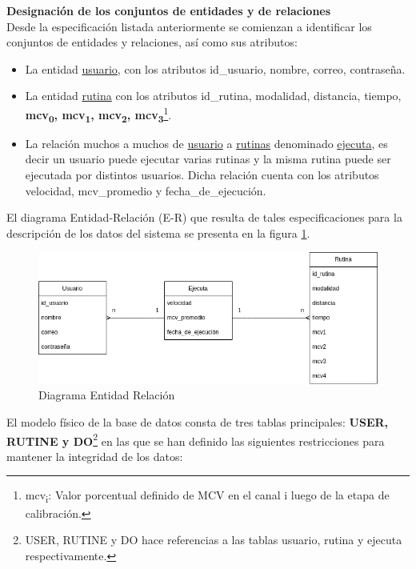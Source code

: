 \vspace{5pt}
\textbf{Designación de los conjuntos de entidades y de relaciones}\\
Desde la especificación listada anteriormente se comienzan a
identificar los conjuntos de entidades y relaciones, así como sus atributos:
\begin{itemize}
    \item La entidad \underline{usuario}, con los atributos id\_usuario, nombre, correo, contraseña.
    \item La entidad \underline{rutina} con los atributos id\_rutina, modalidad, distancia, tiempo, \textbf{mcv\textsubscript{0}, mcv\textsubscript{1}, mcv\textsubscript{2}, mcv\textsubscript{3}}\footnote{mcv\textsubscript{i}: Valor porcentual definido de MCV en el canal i luego de la etapa de calibración.}.
    \item La relación muchos a muchos de \underline{usuario} a \underline{rutinas} denominado \underline{ejecuta}, es decir un usuario puede ejecutar 
    varias rutinas y la misma rutina puede ser ejecutada por distintos usuarios. Dicha relación cuenta con los atributos velocidad, mcv\_promedio y fecha\_de\_ejecución. 
\end{itemize}
    
\vspace{5pt}
El diagrama Entidad-Relación (E-R) que resulta de tales especificaciones para la descripción de los datos del sistema se presenta en la figura \ref{fig: diagram-er}.
\begin{figure}[ht]
    \centering
    \includegraphics[scale=0.48]{images/diagram-er.png}
    \caption{Diagrama Entidad Relación}
    \label{fig: diagram-er}
\end{figure}

El modelo físico de la base de datos consta de tres tablas principales: \textbf{USER, RUTINE y DO}\footnote{USER, RUTINE y DO hace referencias a las tablas usuario, rutina y ejecuta respectivamente.} en las que se han definido las siguientes restricciones para mantener la integridad de los datos:

